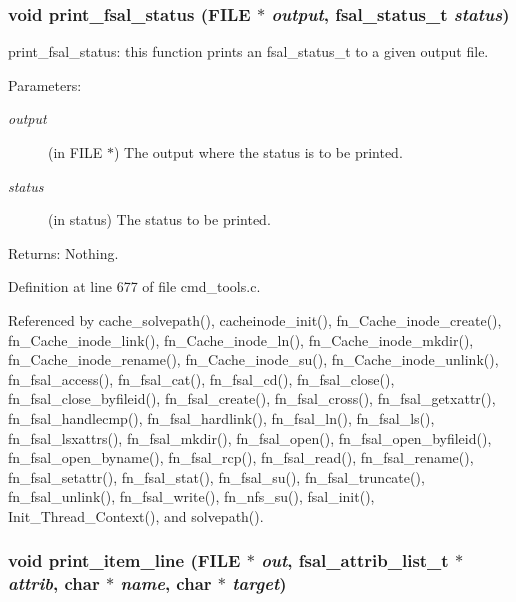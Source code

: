 \subsubsection{\setlength{\rightskip}{0pt plus 5cm}void print\_\-fsal\_\-status (FILE $\ast$ {\em output}, fsal\_\-status\_\-t {\em status})}\label{cmd__tools_8h_a18}


print\_\-fsal\_\-status: this function prints an fsal\_\-status\_\-t to a given output file.

\begin{Desc}
\item[Parameters:]
\begin{description}
\item[{\em output}](in FILE $\ast$) The output where the status is to be printed. \item[{\em status}](in status) The status to be printed.\end{description}
\end{Desc}
\begin{Desc}
\item[Returns:]Nothing. \end{Desc}


Definition at line 677 of file cmd\_\-tools.c.

Referenced by cache\_\-solvepath(), cacheinode\_\-init(), fn\_\-Cache\_\-inode\_\-create(), fn\_\-Cache\_\-inode\_\-link(), fn\_\-Cache\_\-inode\_\-ln(), fn\_\-Cache\_\-inode\_\-mkdir(), fn\_\-Cache\_\-inode\_\-rename(), fn\_\-Cache\_\-inode\_\-su(), fn\_\-Cache\_\-inode\_\-unlink(), fn\_\-fsal\_\-access(), fn\_\-fsal\_\-cat(), fn\_\-fsal\_\-cd(), fn\_\-fsal\_\-close(), fn\_\-fsal\_\-close\_\-byfileid(), fn\_\-fsal\_\-create(), fn\_\-fsal\_\-cross(), fn\_\-fsal\_\-getxattr(), fn\_\-fsal\_\-handlecmp(), fn\_\-fsal\_\-hardlink(), fn\_\-fsal\_\-ln(), fn\_\-fsal\_\-ls(), fn\_\-fsal\_\-lsxattrs(), fn\_\-fsal\_\-mkdir(), fn\_\-fsal\_\-open(), fn\_\-fsal\_\-open\_\-byfileid(), fn\_\-fsal\_\-open\_\-byname(), fn\_\-fsal\_\-rcp(), fn\_\-fsal\_\-read(), fn\_\-fsal\_\-rename(), fn\_\-fsal\_\-setattr(), fn\_\-fsal\_\-stat(), fn\_\-fsal\_\-su(), fn\_\-fsal\_\-truncate(), fn\_\-fsal\_\-unlink(), fn\_\-fsal\_\-write(), fn\_\-nfs\_\-su(), fsal\_\-init(), Init\_\-Thread\_\-Context(), and solvepath().
\subsubsection{\setlength{\rightskip}{0pt plus 5cm}void print\_\-item\_\-line (FILE $\ast$ {\em out}, fsal\_\-attrib\_\-list\_\-t $\ast$ {\em attrib}, char $\ast$ {\em name}, char $\ast$ {\em target})}\label{cmd__tools_8h_a22}


